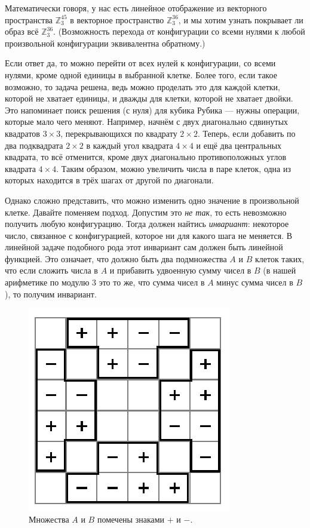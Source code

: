 Математически говоря, у нас есть линейное отображение из векторного пространства $\mathbb{Z}_3^{45}$ в векторное пространство $\mathbb{Z}_3^{36}$, и мы хотим узнать покрывает ли образ всё $\mathbb{Z}_3^{36}$.
(Возможность перехода от конфигурации со всеми нулями к любой произвольной конфигурации эквивалентна обратному.)

Если ответ да, то можно перейти от всех нулей к конфигурации, со всеми нулями, кроме одной единицы в выбранной клетке.
Более того, если такое возможно, то задача решена, ведь можно проделать это для каждой клетки, которой не хватает единицы, и дважды для клетки, которой не хватает двойки.
Это напоминает поиск решения (с нуля) для кубика Рубика --- нужны операции, которые мало чего меняют.
Например, начнём с двух диагонально сдвинутых квадратов $3 \times 3$, перекрывающихся по квадрату $2 \times 2$.
Теперь, если добавить по два подквадрата $2 \times 2$ в каждый угол квадрата $4 \times 4$ и ещё два центральных квадрата, то всё отменится, кроме двух диагонально противоположных углов квадрата $4 \times 4$.
Таким образом, можно увеличить числа в паре клеток, одна из которых находится в трёх шагах от другой по диагонали.

Однако сложно представить, что можно изменить одно значение в произвольной клетке.
Давайте поменяем подход.
Допустим это \emph{не так}, то есть невозможно получить любую конфигурацию.
Тогда должен найтись \emph{инвариант}: некоторое число, связанное с конфигурацией, которое ни для какого шага не меняется.
В линейной задаче подобного рода этот инвариант сам должен быть линейной функцией.
Это означает, что должно быть два подмножества $A$ и $B$ клеток таких, что если сложить числа в $A$ и прибавить удвоенную сумму чисел в $B$ (в нашей арифметике по модулю $3$ это то же, что сумма чисел в $A$ минус сумма чисел в $B$), то получим инвариант.

\begin{figure}[t!]
\centering
\includegraphics[scale=1]{pics/chess2}
\caption{Множества $A$ и $B$ помечены знаками $+$ и $-$.}
\label{pic:chess2}
\end{figure}

